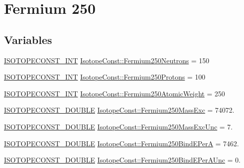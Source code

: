 \hypertarget{group___isotope_const-_fermium-_fm250}{}\section{Fermium 250}
\label{group___isotope_const-_fermium-_fm250}
\subsection*{Variables}
\begin{DoxyCompactItemize}
\item 
\mbox{\hyperlink{group___isotope_const-_macros_ga5f18360b3e99483a35c32d789e62621c}{I\+S\+O\+T\+O\+P\+E\+C\+O\+N\+S\+T\+\_\+\+I\+NT}} \mbox{\hyperlink{group___isotope_const-_fermium-_fm250_ga4e6d85241bf6d100e2d7ff4922bf33d7}{Isotope\+Const\+::\+Fermium250\+Neutrons}} = 150
\item 
\mbox{\hyperlink{group___isotope_const-_macros_ga5f18360b3e99483a35c32d789e62621c}{I\+S\+O\+T\+O\+P\+E\+C\+O\+N\+S\+T\+\_\+\+I\+NT}} \mbox{\hyperlink{group___isotope_const-_fermium-_fm250_gad33ff087651ede9e9ad1c62421535d74}{Isotope\+Const\+::\+Fermium250\+Protons}} = 100
\item 
\mbox{\hyperlink{group___isotope_const-_macros_ga5f18360b3e99483a35c32d789e62621c}{I\+S\+O\+T\+O\+P\+E\+C\+O\+N\+S\+T\+\_\+\+I\+NT}} \mbox{\hyperlink{group___isotope_const-_fermium-_fm250_gae5e051f0e9c306f930ebf1d766311e16}{Isotope\+Const\+::\+Fermium250\+Atomic\+Weight}} = 250
\item 
\mbox{\hyperlink{group___isotope_const-_macros_ga8f45a7272ce02c0b4c65c44636ed719a}{I\+S\+O\+T\+O\+P\+E\+C\+O\+N\+S\+T\+\_\+\+D\+O\+U\+B\+LE}} \mbox{\hyperlink{group___isotope_const-_fermium-_fm250_ga5e2c45835fd040bae8cc3c0738096a61}{Isotope\+Const\+::\+Fermium250\+Mass\+Exc}} = 74072.
\item 
\mbox{\hyperlink{group___isotope_const-_macros_ga8f45a7272ce02c0b4c65c44636ed719a}{I\+S\+O\+T\+O\+P\+E\+C\+O\+N\+S\+T\+\_\+\+D\+O\+U\+B\+LE}} \mbox{\hyperlink{group___isotope_const-_fermium-_fm250_ga5450693d156184c3e32bd2d1343f51c4}{Isotope\+Const\+::\+Fermium250\+Mass\+Exc\+Unc}} = 7.
\item 
\mbox{\hyperlink{group___isotope_const-_macros_ga8f45a7272ce02c0b4c65c44636ed719a}{I\+S\+O\+T\+O\+P\+E\+C\+O\+N\+S\+T\+\_\+\+D\+O\+U\+B\+LE}} \mbox{\hyperlink{group___isotope_const-_fermium-_fm250_gadcb698054fe019456e95eb895534da15}{Isotope\+Const\+::\+Fermium250\+Bind\+E\+PerA}} = 7462.
\item 
\mbox{\hyperlink{group___isotope_const-_macros_ga8f45a7272ce02c0b4c65c44636ed719a}{I\+S\+O\+T\+O\+P\+E\+C\+O\+N\+S\+T\+\_\+\+D\+O\+U\+B\+LE}} \mbox{\hyperlink{group___isotope_const-_fermium-_fm250_ga1e8ac7dbb63daf09e9b677602e1bec8c}{Isotope\+Const\+::\+Fermium250\+Bind\+E\+Per\+A\+Unc}} = 0.

\end{DoxyCompactItemize}
